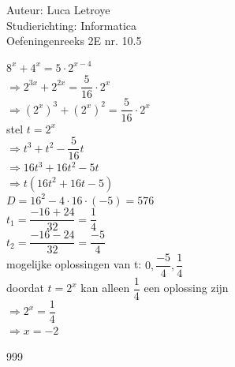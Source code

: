 \documentclass[a4paper]{article}
\begin{document}
  
\noindent \large Auteur: Luca Letroye        \\
\noindent \large Studierichting: Informatica \\
\noindent \large Oefeningenreeks 2E nr. 10.5 \\

\medskip

\normalsize

$8^x+4^x = 5\cdot 2^{x-4}$\\

$\Rightarrow 2^{3x} + 2^{2x} = \dfrac{5}{16}\cdot 2^x$\\

$\Rightarrow \left(2^x \right)^3 + \left(2^x \right)^2 =   \dfrac{5}{16}\cdot 2^x$\\

stel $t = 2^x$\\

$\Rightarrow t^3 +t^2 - \dfrac{5}{16}t$\\

$\Rightarrow 16t^3 +16t^2 - 5t$\\

$\Rightarrow t(16t^2 +16t - 5)$\\

$D = 16^2-4\cdot 16 \cdot (-5) = 576$\\

$t_1 = \dfrac{-16+24}{32} = \dfrac{1}{4}$\\

$t_2 = \dfrac{-16-24}{32} = \dfrac{-5}{4}$\\

mogelijke oplossingen van t: $0, \dfrac{-5}{4}, \dfrac{1}{4}$\\

doordat $t = 2^x$ kan alleen $\dfrac{1}{4}$ een oplossing zijn\\

$\Rightarrow2^x = \dfrac{1}{4}$\\

$\Rightarrow x = -2$\\


\begin{thebibliography}{999}
\end{thebibliography}
\end{document}
